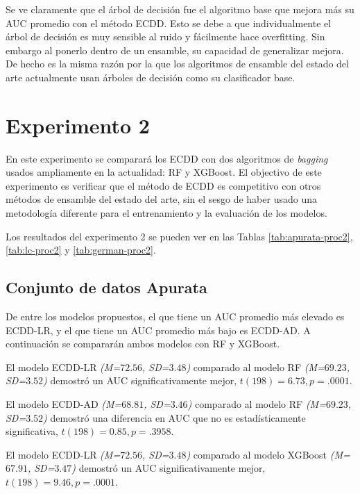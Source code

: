 Se ve claramente que el árbol de decisión fue el algoritmo base que mejora más su \ac{AUC} promedio con el método \ac{ECDD}. Esto se debe a que individualmente el árbol de decisión es muy sensible al ruido y fácilmente hace overfitting. Sin embargo al ponerlo dentro de un ensamble, su capacidad de generalizar mejora. De hecho es la misma razón por la que los algoritmos de ensamble del estado del arte actualmente usan árboles de decisión como su clasificador base.




\section{Experimento 2} %

En este experimento se comparará los \ac{ECDD} con dos algoritmos de \textit{bagging} usados ampliamente en la actualidad: \ac{RF} y \ac{XGBoost}. El objectivo de este experimento es verificar que el método de \ac{ECDD} es competitivo con otros métodos de ensamble del estado del arte, sin el sesgo de haber usado una metodología diferente para el entrenamiento y la evaluación de los modelos.

Los resultados del experimento 2 se pueden ver en las Tablas \ref{tab:apurata-proc2}, \ref{tab:lc-proc2} y \ref{tab:german-proc2}.

\subsection{Conjunto de datos Apurata}

De entre los modelos propuestos, el que tiene un \ac{AUC} promedio más elevado es ECDD-LR, y el que tiene un \ac{AUC} promedio más bajo es ECDD-AD. A continuación se compararán ambos modelos con \ac{RF} y \ac{XGBoost}.

El modelo ECDD-LR \textit{(M=$72.56$, SD=$3.48$)} comparado al modelo \ac{RF} \textit{(M=$69.23$, SD=$3.52$)} demostró un \ac{AUC} significativamente mejor, $t(198)=6.73, p=.0001$.

El modelo ECDD-AD  \textit{(M=$68.81$, SD=$3.46$)} comparado al modelo \ac{RF} \textit{(M=$69.23$, SD=$3.52$)} demostró una diferencia en \ac{AUC} que no es estadísticamente significativa, $t(198)=0.85, p=.3958$.

El modelo ECDD-LR \textit{(M=$72.56$, SD=$3.48$)} comparado al modelo \ac{XGBoost} \textit{(M=$67.91$, SD=$3.47$)} demostró un \ac{AUC} significativamente mejor, $t(198)=9.46, p=.0001$.

